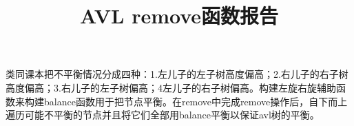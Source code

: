 \documentclass{article}
\title{AVL remove函数报告}
\author{}
\date{}
\begin{document}
\maketitle
类同课本把不平衡情况分成四种：1.左儿子的左子树高度偏高；2.右儿子的右子树高度偏高；3.右儿子的左子树偏高；4左儿子的右子树偏高。构建左旋右旋辅助函数来构建balance函数用于把节点平衡。在remove中完成remove操作后，自下而上遍历可能不平衡的节点并且将它们全部用balance平衡以保证avl树的平衡。
\end{document}
